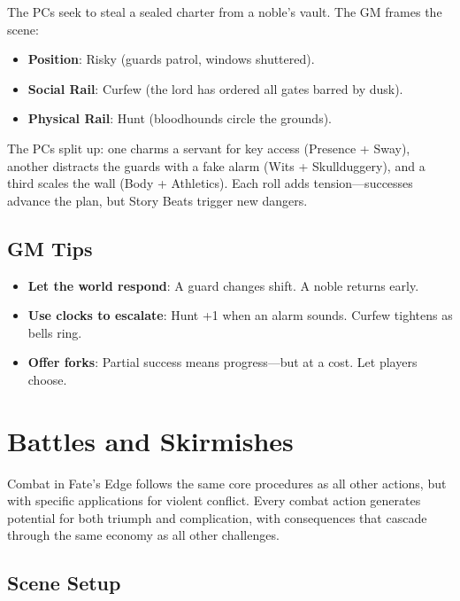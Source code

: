The PCs seek to steal a sealed charter from a noble's vault. The GM frames the scene:

\begin{itemize}
    \item \textbf{Position}: Risky (guards patrol, windows shuttered).
    \item \textbf{Social Rail}: Curfew (the lord has ordered all gates barred by dusk).
    \item \textbf{Physical Rail}: Hunt (bloodhounds circle the grounds).
\end{itemize}

The PCs split up: one charms a servant for key access (Presence + Sway), another distracts the guards with a fake alarm (Wits + Skullduggery), and a third scales the wall (Body + Athletics). Each roll adds tension---successes advance the plan, but Story Beats trigger new dangers.

\subsection*{GM Tips}

\begin{itemize}
    \item \textbf{Let the world respond}: A guard changes shift. A noble returns early.
    \item \textbf{Use clocks to escalate}: Hunt +1 when an alarm sounds. Curfew tightens as bells ring.
    \item \textbf{Offer forks}: Partial success means progress---but at a cost. Let players choose.
\end{itemize}

\section*{Battles and Skirmishes}

Combat in Fate's Edge follows the same core procedures as all other actions, but with specific applications for violent conflict. Every combat action generates potential for both triumph and complication, with consequences that cascade through the same economy as all other challenges.

\subsection*{Scene Setup}

